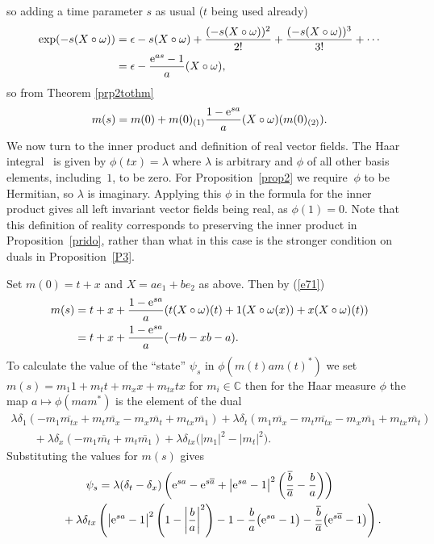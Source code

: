 \documentclass[10pt,a4paper]{amsart}
\numberwithin{equation}{section}
\newcommand{\C}{\mathbb{C}}
\newcommand{\<}{\langle}
\renewcommand{\>}{\rangle}
\begin{document}
so adding a time parameter $ s $ as usual ($ t $ being used already)
\begin{align*}
	\exp(-s(X \circ \omega))& = \epsilon-s (X \circ \omega)+\frac{(-s (X \circ \omega))^{2}}{2!}+\frac{(-s (X \circ \omega))^{3}}{3 !}+\cdots \\ & =\epsilon-\dfrac{{\rm e}^{as}-1}{a}(X \circ \omega),
\end{align*}
so from Theorem \ref{prp2tothm}
\begin{gather}\label{e71}
	m(s)=m(0)+ m(0)_{(1)} \dfrac{1-{\rm e}^{s a}}{a} (X \circ \omega)(m(0)_{(2)}).
\end{gather}
We now turn to the inner product and definition of real vector fields. The Haar integral~\cite{BMbook} is given by $ \phi (t x)= \lambda $ where $ \lambda $ is arbitrary and $ \phi $ of all other basis elements, including~$ 1 $, to be zero. For Proposition~\ref{prop2} we require $~\phi $ to be Hermitian, so $ \lambda $ is imaginary. Applying this $ \phi $ in the formula for the inner product gives all left invariant vector fields being real, as $ \phi (1)=0 $. Note that this definition of reality corresponds to preserving the inner product in Proposition~\ref{prido}, rather than what in this case is the stronger condition on duals in Proposition~\ref{P3}.
\begin{Example}
Set $ m(0)=t+x $ and $ X=a e_{1}+be_{2} $ as above. Then by (\ref{e71})
\begin{align*}%
	m(s)& =t+x+\dfrac{1-{\rm e}^{s a}}{a} (t (X \circ \omega) (t) +1 (X \circ \omega(x))+x (X \circ \omega)(t))\\
& =t+x+\dfrac{1-{\rm e}^{s a}}{a} (-tb -xb-a).
\end{align*}
To calculate the value of the ``state'' $ \psi_s $ in $ \phi(m(t) a m(t)^{*}) $ we set $ m(s)= m_{1} 1+m_{t} t +m_{x} x +m_{tx} tx $ for $ m _{i}\in \C $ then for the Haar measure $ \phi $ the map $ a \mapsto \phi(m a m^{*}) $ is the element of the dual
\begin{gather*}
	 \lambda \delta_{1} (-m _{1} \overline{m_{tx}} +m_{t} \overline{m_{x}}-m_{x} \overline{m_{t}}+m_{t x}\overline{m_{1}} )+ \lambda \delta_{t } (m _{1} \overline{m_{x}} -m_{t} \overline{m_{tx}}-m_{x} \overline{m_{1}}+m_{t x}\overline{m_{t}} ) \\
\qquad{} + \lambda \delta_{x} (-m _{1} \overline{m_{t}} +m_{t} \overline{m_{1}} ) +\lambda \delta_{tx} \big(|m _{1}|^{2} - |m _{t}|^{2} \big).
\end{gather*}
Substituting the values for $ m(s) $ gives
\begin{gather*}
	\psi_s = \lambda (\delta_{t} -\delta_{x} )\left({\rm e}^{sa}-{\rm e}^{s\overline{a}}+\big|{\rm e}^{sa}-1\big|^{2}\left(\frac{\overline{b}}{\overline{a}}-\frac{b}{a}\right)\right)\\
\hphantom{\psi_s =}{}
+\lambda \delta_{tx} \left(\big|{\rm e}^{sa}-1\big|^{2} \left(1-\left|\frac{b}{a}\right|^{2}\right)-1-\dfrac{b}{a} \big({\rm e}^{sa}-1\big)- \frac{\overline{b}}{\overline{a}}\big({\rm e}^{s\overline{a}}-1\big)\right).
\end{gather*}
\end{Example}
\end{document}
